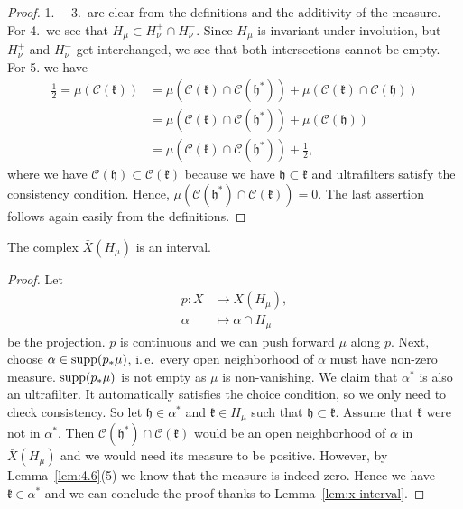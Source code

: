 \begin{proof}
  1.\ -- 3.\ are clear from the definitions and the additivity of the measure. For 4.\ we see that \(H_\mu \subset H_\nu^+ \cap H_\nu^-\). Since \(H_\mu\) is invariant under involution, but \(H_\nu^+\) and \(H_\nu^-\) get interchanged, we see that both intersections cannot be empty. For 5. we have
  \begin{align*}
    \frac{1}{2} = \mu(\mathcal{C}(\mathfrak{k}))
    & = \mu(\mathcal{C}(\mathfrak{k}) \cap \mathcal{C}(\mathfrak{h^\ast})) + \mu(\mathcal{C}(\mathfrak{k}) \cap \mathcal{C}(\mathfrak{h}))\\
    & = \mu(\mathcal{C}(\mathfrak{k}) \cap \mathcal{C}(\mathfrak{h^\ast})) + \mu(\mathcal{C}(\mathfrak{h}))\\
    & = \mu(\mathcal{C}(\mathfrak{k}) \cap \mathcal{C}(\mathfrak{h^\ast})) + \frac{1}{2},
  \end{align*}
  where we have \(\mathcal{C}(\mathfrak{h}) \subset \mathcal{C}(\mathfrak{k})\) because we have \(\mathfrak{h} \subset \mathfrak{k}\) and ultrafilters satisfy the consistency condition. Hence, \(\mu(\mathcal{C}(\mathfrak{h^\ast}) \cap \mathcal{C}(\mathfrak{k})) = 0\). The last assertion follows again easily from the definitions.
\end{proof}

\begin{lemma}[{\cite[Lem. 4.7]{MR3509968}}]
  \label{lem:interval}
  The complex \(\bar X(H_\mu)\) is an interval.
\end{lemma}

\begin{proof}
  Let
  \begin{align*}
    p \colon \bar X &\to \bar X (H_\mu),\\
    \alpha &\mapsto \alpha \cap H_\mu
  \end{align*}
  be the projection. \(p\) is continuous and we can push forward \(\mu\) along \(p\). Next, choose \(\alpha \in \operatorname{supp}(p_\ast \mu)\), i.\,e.\ every open neighborhood of \(\alpha\) must have non-zero measure. \(\operatorname{supp}(p_\ast \mu)\) is not empty as \(\mu\) is non-vanishing. We claim that \(\alpha^\ast\) is also an ultrafilter. It automatically satisfies the choice condition, so we only need to check consistency. So let \(\mathfrak{h} \in \alpha^\ast\) and \(\mathfrak{k} \in H_\mu\) such that \(\mathfrak{h} \subset \mathfrak{k}\). Assume that \(\mathfrak{k}\) were not in \(\alpha^\ast\). Then \(\mathcal{C}(\mathfrak{h^\ast}) \cap \mathcal{C}(\mathfrak{k})\) would be an open neighborhood of \(\alpha\) in \(\bar X(H_\mu)\) and we would need its measure to be positive. However, by Lemma~\ref{lem:4.6}(5) we know that the measure is indeed zero. Hence we have \(\mathfrak{k} \in \alpha^\ast\) and we can conclude the proof thanks to Lemma~\ref{lem:x-interval}.
\end{proof}

